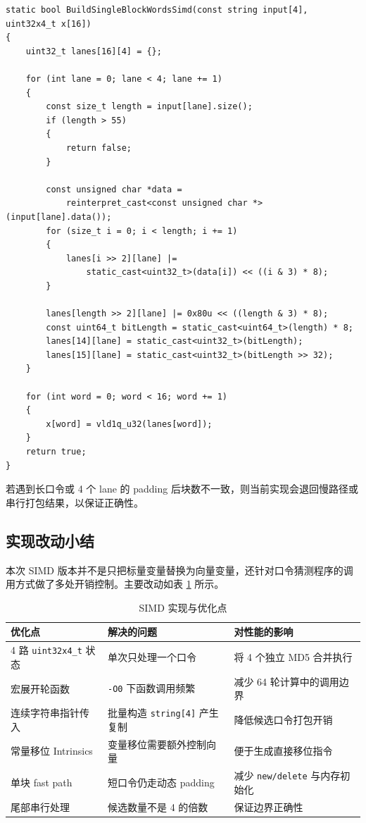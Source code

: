\documentclass[UTF8,a4paper,12pt]{ctexart}
\begin{document}
\begin{lstlisting}[style=cppstyle,caption={短口令 fast path}]
static bool BuildSingleBlockWordsSimd(const string input[4], uint32x4_t x[16])
{
    uint32_t lanes[16][4] = {};

    for (int lane = 0; lane < 4; lane += 1)
    {
        const size_t length = input[lane].size();
        if (length > 55)
        {
            return false;
        }

        const unsigned char *data =
            reinterpret_cast<const unsigned char *>(input[lane].data());
        for (size_t i = 0; i < length; i += 1)
        {
            lanes[i >> 2][lane] |=
                static_cast<uint32_t>(data[i]) << ((i & 3) * 8);
        }

        lanes[length >> 2][lane] |= 0x80u << ((length & 3) * 8);
        const uint64_t bitLength = static_cast<uint64_t>(length) * 8;
        lanes[14][lane] = static_cast<uint32_t>(bitLength);
        lanes[15][lane] = static_cast<uint32_t>(bitLength >> 32);
    }

    for (int word = 0; word < 16; word += 1)
    {
        x[word] = vld1q_u32(lanes[word]);
    }
    return true;
}
\end{lstlisting}

若遇到长口令或 4 个 lane 的 padding 后块数不一致，则当前实现会退回慢路径或串行打包结果，以保证正确性。

\subsection{实现改动小结}

本次 SIMD 版本并不是只把标量变量替换为向量变量，还针对口令猜测程序的调用方式做了多处开销控制。主要改动如表 \ref{tab:impl-summary} 所示。

\begin{table}[H]
    \centering
    \caption{SIMD 实现与优化点}
    \label{tab:impl-summary}
    \small
    \begin{tabular}{lll}
        \toprule
        优化点 & 解决的问题 & 对性能的影响 \\
        \midrule
        4 路 \texttt{uint32x4\_t} 状态 & 单次只处理一个口令 & 将 4 个独立 MD5 合并执行 \\
        宏展开轮函数 & \texttt{-O0} 下函数调用频繁 & 减少 64 轮计算中的调用边界 \\
        连续字符串指针传入 & 批量构造 \texttt{string[4]} 产生复制 & 降低候选口令打包开销 \\
        常量移位 Intrinsics & 变量移位需要额外控制向量 & 便于生成直接移位指令 \\
        单块 fast path & 短口令仍走动态 padding & 减少 \texttt{new/delete} 与内存初始化 \\
        尾部串行处理 & 候选数量不是 4 的倍数 & 保证边界正确性 \\
        \bottomrule
    \end{tabular}
\end{table}
\end{document}
